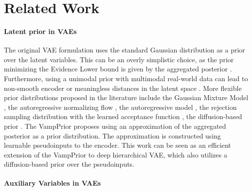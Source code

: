 \section{Related Work}
\paragraph{Latent prior in VAEs}
The original VAE formulation uses the standard Gaussian distribution as a prior over the latent variables.
This can be an overly simplistic choice, as the prior minimizing the Evidence Lower bound is given by the aggregated posterior \citep{hoffman2016elbo, tomczak2018vae}. 
Furthermore, using a unimodal prior with multimodal real-world data can lead to non-smooth encoder or meaningless distances in the latent space \citet{bozkurt2019rate}.
More flexible prior distributions proposed in the literature include the Gaussian Mixture Model \citep{jiang2016variational, nalisnick2016approximate, tran2022cauchy}, the autoregressive normalizing flow \citep{chen2016variational}, the autoregressive model \citep{gulrajani2016pixelvae, sadeghi2019pixelvae++}, the rejection sampling distribution with the learned acceptance function \citep{bauer2019resampled}, the diffusion-based prior \citep{vahdat2021score, wehenkel2021diffusion}. The VampPrior \citep{tomczak2018vae} proposes using an approximation of the aggregated posterior as a prior distribution. The approximation is constructed using learnable pseudoinputs to the encoder.
This work can be seen as an efficient extension of the VampPrior to deep hierarchical VAE, which also utilizes a diffusion-based prior over the pseudoinputs. 

\paragraph{Auxiliary Variables in VAEs}

